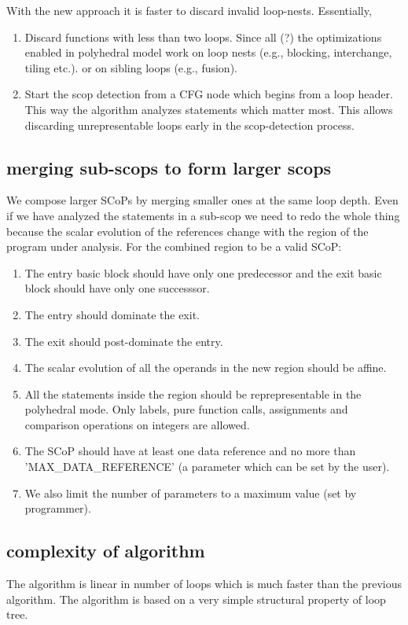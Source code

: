 \documentclass{sigplanconf}
\begin{document}
With the new approach it is faster to discard invalid loop-nests. Essentially,
\begin{enumerate}
\item Discard functions with less than two loops. Since all (?) the optimizations enabled in polyhedral model work
  on loop nests (e.g., blocking, interchange, tiling etc.).  or on sibling loops (e.g., fusion).
\item Start the scop detection from a CFG node which begins from a loop header. This way the algorithm analyzes
  statements which matter most. This allows discarding unrepresentable loops early in the scop-detection process.
\end{enumerate}

\subsection{merging sub-scops to form larger scops}
We compose larger SCoPs by merging smaller ones at the same loop depth. Even if we have analyzed the statements
in a sub-scop we need to redo the whole thing because the scalar evolution
of the references change with the region of the program under analysis. For the combined region to be a valid SCoP:
\begin{enumerate}
  \item The entry basic block should have only one predecessor and the exit basic block should have only one
    successsor.
  \item The entry should dominate the exit.
  \item The exit should post-dominate the entry.
  \item The scalar evolution of all the operands in the new region should be affine.
  \item All the statements inside the region should be reprepresentable in the polyhedral mode.
  Only labels, pure function calls, assignments and comparison operations on integers are allowed.
  \item The SCoP should have at least one data reference and no more than
    'MAX\_DATA\_REFERENCE' (a parameter which can be set by the user).
  \item We also limit the number of parameters to a maximum value (set by programmer).
\end{enumerate}

\subsection{complexity of algorithm}
The algorithm is linear in number of loops
which is much faster than the previous algorithm. The algorithm is based on a very simple structural property of loop
tree.
\end{document}
